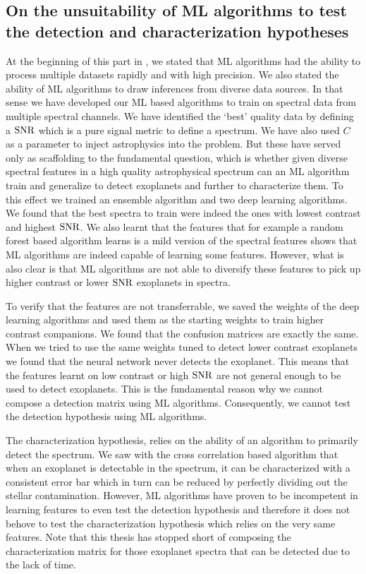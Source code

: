\subsection{On the unsuitability of ML algorithms to test the detection and characterization hypotheses}
At the beginning of this part in , we stated that ML algorithms had the ability to process multiple datasets rapidly and with high precision. 
We also stated the ability of ML algorithms to draw inferences from diverse data sources.
In that sense we have developed our ML based algorithms to train on spectral data from multiple spectral channels.
We have identified the `best' quality data by defining a $\rm{SNR}$ which is a pure signal metric to define a spectrum.
We have also used $C$ as a parameter to inject astrophysics into the problem.
But these have served only as scaffolding to the fundamental question, which is whether given diverse spectral features in a high quality astrophysical spectrum can an ML algorithm train and generalize to detect exoplanets and further to characterize them.
To this effect we trained an ensemble algorithm and two deep learning algorithms.
We found that the best spectra to train were indeed the ones with lowest contrast and highest $\rm{SNR}$.
We also learnt that the features that for example a random forest based algorithm learns is a mild version of the spectral features shows that ML algorithms are indeed capable of learning some features.
However, what is also clear is that ML algorithms are not able to diversify these features to pick up higher contrast or lower $\rm{SNR}$ exoplanets in spectra.

To verify that the features are not transferrable, we saved the weights of the deep learning algorithms and used them as the starting weights to train higher contrast companions. 
We found that the confusion matrices are exactly the same. 
When we tried to use the same weights tuned to detect lower contrast exoplanets we found that the neural network never detects the exoplanet. 
This means that the features learnt on low contrast or high $\rm{SNR}$ are not general enough to be used to detect exoplanets.
This is the fundamental reason why we cannot compose a detection matrix using ML algorithms.
Consequently, we cannot test the detection hypothesis using ML algorithms.

The characterization hypothesis, relies on the ability of an algorithm to primarily detect the spectrum. 
We saw with the cross correlation based algorithm that when an exoplanet is detectable in the spectrum, it can be characterized with a consistent error bar which in turn can be reduced by perfectly dividing out the stellar contamination.
However, ML algorithms have proven to be incompetent in learning features to even test the detection hypothesis and therefore it does not behove to test the characterization hypothesis which relies on the very same features.
Note that this thesis has stopped short of composing the characterization matrix for those exoplanet spectra that can be detected due to the lack of time.
